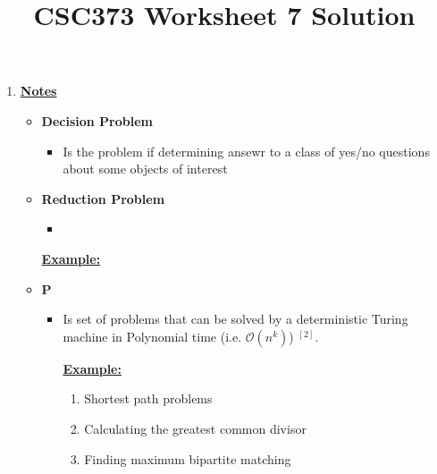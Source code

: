 \documentclass[12pt]{article}
\begin{document}
\title{CSC373 Worksheet 7 Solution}
\maketitle

\bigskip

\begin{enumerate}[1.]
    \item

    \bigskip

    \underline{\textbf{Notes}}

    \begin{itemize}
        \item \textbf{Decision Problem}

        \begin{itemize}
            \item Is the problem if determining ansewr to a class of yes/no questions
            about some objects of interest
        \end{itemize}

        \bigskip

        \item \textbf{Reduction Problem}

        \begin{itemize}
            \item
        \end{itemize}

        \underline{\textbf{Example:}}

        \item \textbf{P}

        \begin{itemize}
            \item Is set of problems that can be solved by a deterministic Turing machine in Polynomial time (i.e. $\mathcal{O}(n^k)$) $^{[2]}$.

            \bigskip

            \underline{\textbf{Example:}}

            \bigskip

            \begin{enumerate}[1)]
                \item Shortest path problems
                \item Calculating the greatest common divisor
                \item Finding maximum bipartite matching
            \end{enumerate}


\end{itemize}
\end{itemize}
\end{enumerate}
\end{document}
